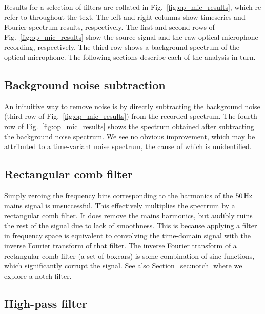 \documentclass[aps,pra,superscriptaddress,reprint,nofootinbib]{revtex4-1}
\begin{document}
Results for a selection of filters are collated in Fig.~\ref{fig:op_mic_results}, which re refer to throughout the text. 
The left and right columns show timeseries and Fourier spectrum results, respectively. 
The first and second rows of Fig.~\ref{fig:op_mic_results} show the source signal and the raw optical microphone recording, respectively. 
The third row shows a background spectrum of the optical microphone. 
The following sections describe each of the analysis in turn. 



\subsection{Background noise subtraction}

An inituitive way to remove noise is by directly subtracting the background noise (third row of Fig.~\ref{fig:op_mic_results}) from the recorded spectrum. 
The fourth row of Fig.~\ref{fig:op_mic_results} shows the spectrum obtained after subtracting the background noise spectrum. 
We see no obvious improvement, which may be attributed to a time-variant noise spectrum, the cause of which is unidentified. 



\subsection{Rectangular comb filter}

Simply zeroing the frequency bins corresponding to the harmonics of the $50\,{\rm Hz}$ mains signal is unsuccessful. 
This effectively multiplies the spectrum by a rectangular comb filter. 
It does remove the mains harmonics, but audibly ruins the rest of the signal due to lack of smoothness. 
This is because applying a filter in frequency space is equivalent to convolving the time-domain signal with the inverse Fourier transform of that filter. 
The inverse Fourier transform of a rectangular comb filter (a set of boxcars) is some combination of sinc functions, which significantly corrupt the signal. 
See also Section~\ref{sec:notch} where we explore a notch filter. 



\subsection{High-pass filter}
\end{document}
